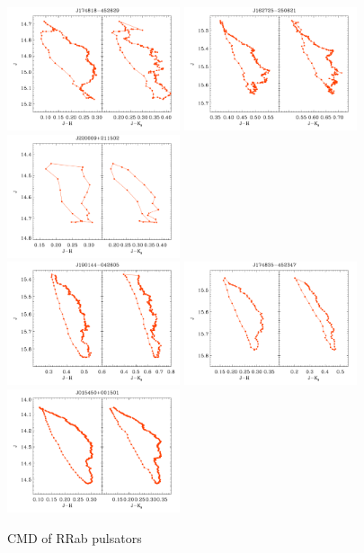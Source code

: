 \documentclass[]{emulateapj}
\begin{document}
 
\begin{figure}[]
\centering
\includegraphics[width=2.0in]{new_plots/rr_cmd_2}
\includegraphics[width=2.0in]{new_plots/rr_cmd_3}
\includegraphics[width=2.0in]{new_plots/rr_cmd_4}\\
\includegraphics[width=2.0in]{new_plots/rr_cmd_5}
\includegraphics[width=2.0in]{new_plots/rr_cmd_6}
\includegraphics[width=2.0in]{new_plots/rr_cmd_7}
\caption{CMD of RRab pulsators}
\label{cmdshort}
\end{figure}
\end{document}
